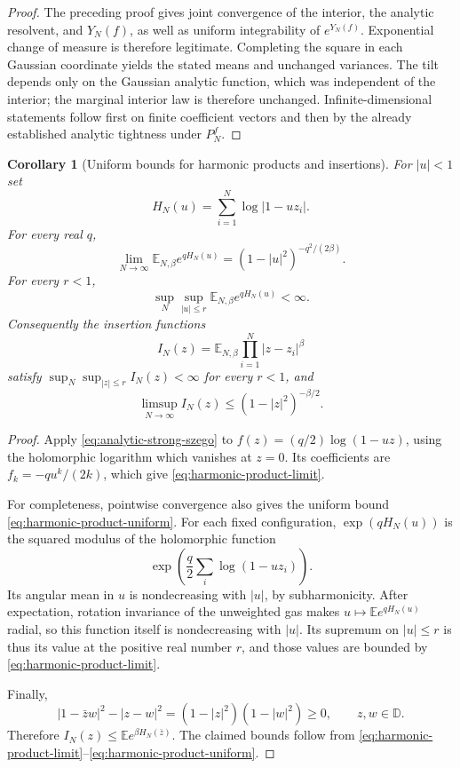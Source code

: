 \documentclass[11pt,a4paper]{article}
\numberwithin{equation}{section}
\newtheorem{corollary}[theorem]{Corollary}
\theoremstyle{definition}
\theoremstyle{remark}
\newcommand{\D}{\mathbb D}
\begin{document}
\begin{proof}
The preceding proof gives joint convergence of the interior, the analytic
resolvent, and $Y_N(f)$, as well as uniform integrability of $e^{Y_N(f)}$.
Exponential change of measure is therefore legitimate. Completing the
square in each Gaussian coordinate yields the stated means and unchanged
variances. The tilt depends only on the Gaussian analytic function,
which was independent of the interior; the marginal interior law is
therefore unchanged. Infinite-dimensional statements follow first on
finite coefficient vectors and then by the already established analytic
tightness under $P_N^f$.
\end{proof}

\begin{corollary}[Uniform bounds for harmonic products and insertions]
\label{cor:harmonic-product-insertion}
For $|u|<1$ set
\[
 H_N(u)=\sum_{i=1}^N\log|1-u z_i|.
\]
For every real $q$,
\begin{equation}\label{eq:harmonic-product-limit}
 \lim_{N\to\infty}\mathbb E_{N,\beta}e^{qH_N(u)}
       =(1-|u|^2)^{-q^2/(2\beta)}.
\end{equation}
For every $r<1$,
\begin{equation}\label{eq:harmonic-product-uniform}
 \sup_N\sup_{|u|\leq r}\mathbb E_{N,\beta}e^{qH_N(u)}<\infty.
\end{equation}
Consequently the insertion functions
\[
 I_N(z)=\mathbb E_{N,\beta}\prod_{i=1}^N|z-z_i|^\beta
\]
satisfy $\sup_N\sup_{|z|\leq r}I_N(z)<\infty$ for every $r<1$, and
\[
 \limsup_{N\to\infty}I_N(z)\leq(1-|z|^2)^{-\beta/2}.
\]
\end{corollary}

\begin{proof}
Apply \eqref{eq:analytic-strong-szego} to
$f(z)=(q/2)\log(1-uz)$, using the holomorphic logarithm which vanishes
at $z=0$. Its coefficients are $f_k=-q u^k/(2k)$, which give
\eqref{eq:harmonic-product-limit}.

For completeness, pointwise convergence also gives the uniform bound
\eqref{eq:harmonic-product-uniform}. For each fixed configuration,
$\exp(qH_N(u))$ is the squared modulus of the holomorphic function
\[
 \exp\left(\frac q2\sum_i\log(1-u z_i)\right).
\]
Its angular mean in $u$ is nondecreasing with $|u|$, by subharmonicity.
After expectation, rotation invariance of the unweighted gas makes
$u\mapsto\mathbb E e^{qH_N(u)}$ radial, so this function itself is
nondecreasing with $|u|$. Its supremum on $|u|\leq r$ is thus its value
at the positive real number $r$, and those values are bounded by
\eqref{eq:harmonic-product-limit}.

Finally,
\[
 |1-\bar z w|^2-|z-w|^2=(1-|z|^2)(1-|w|^2)\geq0,
 \qquad z,w\in\D.
\]
Therefore $I_N(z)\leq\mathbb E e^{\beta H_N(\bar z)}$.
The claimed bounds follow from
\eqref{eq:harmonic-product-limit}--\eqref{eq:harmonic-product-uniform}.
\end{proof}
\end{document}
